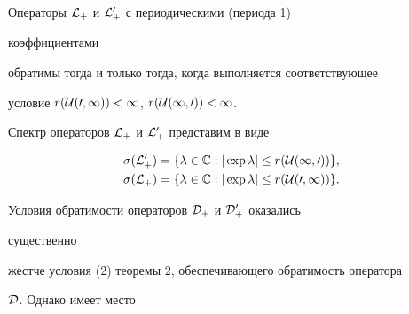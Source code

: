  


\begin{cor} 


Операторы $\cal L_+$ и $\cal L^0_+$ с периодическими (периода 1) 


коэффициентами 


обратимы тогда и только тогда, когда выполняется соответствующее 


условие $r(\cal U(0,1))<1$, $r(\cal U(1,0))<1$. 


Спектр операторов $\cal L_+$ и $\cal L^0_+$ представим в виде 


\begin{align*} 


\sigma(\cal L^0_+)&=\{\lambda\in\Bbb C:|\exp\lambda|\le r(\cal 


U(1,0))\}, \\ 


\sigma(\cal L_+)&=\{\lambda\in\Bbb C:|\exp\lambda|\le r(\cal U(0,1))\}. 


\end{align*} 


\end{cor} 


 


Условия обратимости операторов $\cal D_+$ и $\cal D^0_+$ оказались 


существенно 


жестче условия (2) теоремы 2, обеспечивающего обратимость оператора 


$\cal D$. Однако имеет место 


 


